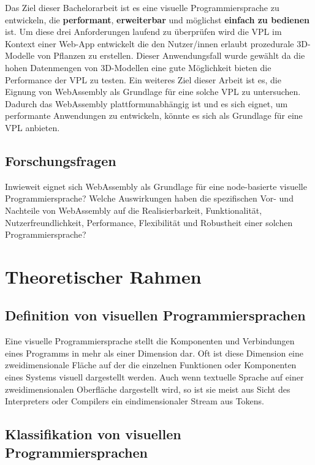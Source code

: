 \documentclass[ngerman]{article}
\begin{document}
Das Ziel dieser Bachelorarbeit ist es eine visuelle Programmiersprache zu entwickeln, die \textbf{performant}, \textbf{erweiterbar} und möglichst \textbf{einfach zu bedienen} ist.
Um diese drei Anforderungen laufend zu überprüfen wird die VPL im Kontext einer Web-App entwickelt die den Nutzer/innen erlaubt prozedurale 3D-Modelle von Pflanzen zu erstellen.
Dieser Anwendungsfall wurde gewählt da die hohen Datenmengen von 3D-Modellen eine gute Möglichkeit bieten die Performance der VPL zu testen.
\br
Ein weiteres Ziel dieser Arbeit ist es, die Eignung von WebAssembly als Grundlage für eine solche VPL zu untersuchen. 
Dadurch das WebAssembly plattformunabhängig ist und es sich eignet, um performante Anwendungen zu entwickeln, könnte es sich als Grundlage für eine VPL anbieten.

\subsection{Forschungsfragen}

Inwieweit eignet sich WebAssembly als Grundlage für eine node-basierte visuelle Programmiersprache?  
\br
Welche Auswirkungen haben die spezifischen Vor- und Nachteile von WebAssembly auf die Realisierbarkeit, Funktionalität, Nutzerfreundlichkeit, Performance, Flexibilität und Robustheit einer solchen Programmiersprache?

\section{Theoretischer Rahmen}

\subsection{Definition von visuellen Programmiersprachen}
Eine visuelle Programmiersprache stellt die Komponenten und Verbindungen eines Programms in mehr als einer Dimension dar. Oft ist diese Dimension eine zweidimensionale Fläche auf der die einzelnen Funktionen oder Komponenten eines Systems visuell dargestellt werden. \cite{Myers}
Auch wenn textuelle Sprache auf einer zweidimensionalen Oberfläche dargestellt wird, so ist sie meist aus Sicht des Interpreters oder Compilers ein eindimensionaler Stream aus Tokens.

\subsection{Klassifikation von visuellen Programmiersprachen}
\end{document}
